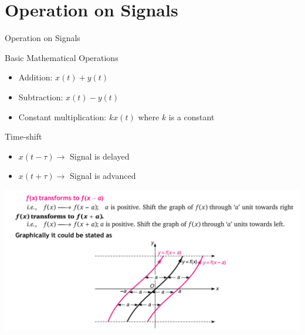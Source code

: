 \documentclass[aspectratio=169,xcolor=dvipsnames,svgnames,x11names,fleqn]{beamer}
\begin{document}
\section{Operation on Signals}


\begin{frame}{}
    \begin{center}
    \Huge \bf \color{DarkBlue}
    \faAreaChart
    
    Operation on Signals
\end{center}
\end{frame}

\begin{frame}{Basic Mathematical Operations}
\begin{itemize}
    \item Addition: $x(t) + y(t)$
\item Subtraction: $x(t) - y(t)$
\item Constant multiplication: $kx(t)$ where $k$ is a constant
\end{itemize}
\end{frame}

\begin{frame}{Time-shift}

\begin{itemize}
    \item $x(t - \tau) \to $ Signal is delayed
\item $x(t + \tau) \to $ Signal is advanced
\end{itemize}
  \includegraphics[width=0.8\linewidth,trim=0 0 0 0cm,clip]{figures/Signal_Delay.png}
    
\end{frame}
\end{document}
